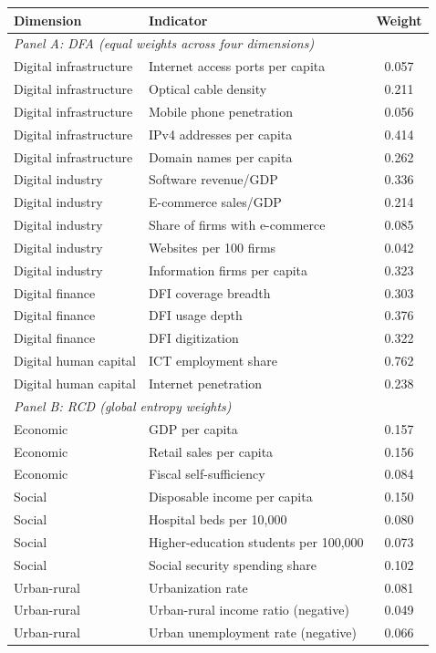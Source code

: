 \begin{tabular}{llc}
\toprule
Dimension & Indicator & Weight \\
\midrule
\multicolumn{3}{l}{\textit{Panel A: DFA (equal weights across four dimensions)}} \\
Digital infrastructure & Internet access ports per capita & 0.057 \\
Digital infrastructure & Optical cable density & 0.211 \\
Digital infrastructure & Mobile phone penetration & 0.056 \\
Digital infrastructure & IPv4 addresses per capita & 0.414 \\
Digital infrastructure & Domain names per capita & 0.262 \\
Digital industry & Software revenue/GDP & 0.336 \\
Digital industry & E-commerce sales/GDP & 0.214 \\
Digital industry & Share of firms with e-commerce & 0.085 \\
Digital industry & Websites per 100 firms & 0.042 \\
Digital industry & Information firms per capita & 0.323 \\
Digital finance & DFI coverage breadth & 0.303 \\
Digital finance & DFI usage depth & 0.376 \\
Digital finance & DFI digitization & 0.322 \\
Digital human capital & ICT employment share & 0.762 \\
Digital human capital & Internet penetration & 0.238 \\
\midrule
\multicolumn{3}{l}{\textit{Panel B: RCD (global entropy weights)}} \\
Economic & GDP per capita & 0.157 \\
Economic & Retail sales per capita & 0.156 \\
Economic & Fiscal self-sufficiency & 0.084 \\
Social & Disposable income per capita & 0.150 \\
Social & Hospital beds per 10,000 & 0.080 \\
Social & Higher-education students per 100,000 & 0.073 \\
Social & Social security spending share & 0.102 \\
Urban-rural & Urbanization rate & 0.081 \\
Urban-rural & Urban-rural income ratio (negative) & 0.049 \\
Urban-rural & Urban unemployment rate (negative) & 0.066 \\
\bottomrule
\end{tabular}